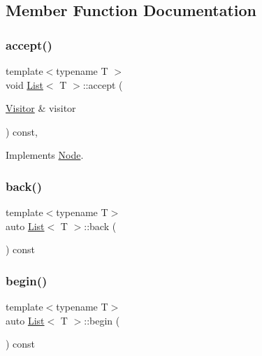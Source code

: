 \subsection{Member Function Documentation}
\mbox{\label{struct_list_a9d87bf19af4c0cca46520b694da550f0}} 
\subsubsection{\texorpdfstring{accept()}{accept()}}
{\footnotesize\ttfamily template$<$typename T $>$ \\
void \hyperlink{struct_list}{List}$<$ T $>$\+::accept (\begin{DoxyParamCaption}\item[{\hyperlink{struct_visitor}{Visitor} \&}]{visitor }\end{DoxyParamCaption}) const\hspace{0.3cm}{\ttfamily [override]}, {\ttfamily [virtual]}}



Implements \hyperlink{struct_node_a10bd7af968140bbf5fa461298a969c71}{Node}.

\mbox{\label{struct_list_a6949268f152305afc5bac0ee3e5bb838}} 
\subsubsection{\texorpdfstring{back()}{back()}}
{\footnotesize\ttfamily template$<$typename T$>$ \\
auto \hyperlink{struct_list}{List}$<$ T $>$\+::back (\begin{DoxyParamCaption}{ }\end{DoxyParamCaption}) const\hspace{0.3cm}{\ttfamily [inline]}}

\mbox{\label{struct_list_afa6f9828eab89e2fcae63b612927fabb}} 
\subsubsection{\texorpdfstring{begin()}{begin()}}
{\footnotesize\ttfamily template$<$typename T$>$ \\
auto \hyperlink{struct_list}{List}$<$ T $>$\+::begin (\begin{DoxyParamCaption}{ }\end{DoxyParamCaption}) const\hspace{0.3cm}{\ttfamily [inline]}}

